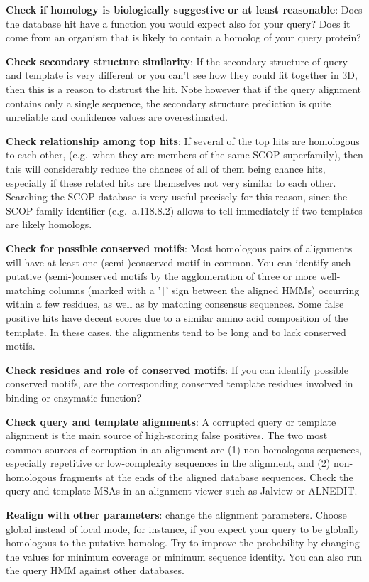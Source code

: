 \documentclass[11pt,a4paper]{article}
\begin{document}
{\bf Check if homology is biologically suggestive or at least reasonable}:
Does the database hit have a function you would expect also for your query? Does it come from an organism that is likely to contain a homolog of your query protein?

{\bf Check secondary structure similarity}:
If the secondary structure of query and template is very different or you can't see how they could fit together in 3D, then this is a reason to distrust the hit. Note however that if the query alignment contains only a single sequence, the secondary structure prediction is quite unreliable and confidence values are overestimated.

{\bf Check relationship among top hits}: 
If several of the top hits are homologous to each other, (e.g.\ when they are members of the same SCOP superfamily), then this will considerably reduce the chances of all of them being chance hits, especially if these related hits are themselves not very similar to each other. Searching the SCOP database is very useful precisely for this reason, since the SCOP family identifier (e.g.\ a.118.8.2) allows to tell immediately if two templates are likely homologs.

{\bf Check for possible conserved motifs}:
Most homologous pairs of alignments will have at least one (semi-)conserved motif in common. You can identify such putative (semi-)conserved motifs by the agglomeration of three or more well-matching columns (marked with a '\verb`|`' sign between the aligned HMMs) occurring within a few residues, as well as by matching consensus sequences. Some false positive hits have decent scores due to a similar amino acid composition of the template. In these cases, the alignments tend to be long and to lack conserved motifs.

{\bf Check residues and role of conserved motifs}: 
If you can identify possible conserved motifs, are the corresponding conserved template residues involved in binding or enzymatic function?

{\bf Check query and template alignments}: 
A corrupted query or template alignment is the main source of high-scoring false positives. The two most common sources of corruption in an alignment are (1) non-homologous sequences, especially repetitive or low-complexity sequences in the alignment, and (2) non-homologous fragments at the ends of the aligned database sequences. Check the query and template MSAs in an alignment viewer such as Jalview or ALNEDIT.

{\bf Realign with other parameters}: 
change the alignment parameters. Choose global instead of local mode, for instance, if you expect your query to be globally homologous to the putative homolog. Try to improve the probability by changing the values for minimum coverage or minimum sequence identity. You can also run the query HMM against other databases.
\end{document}
